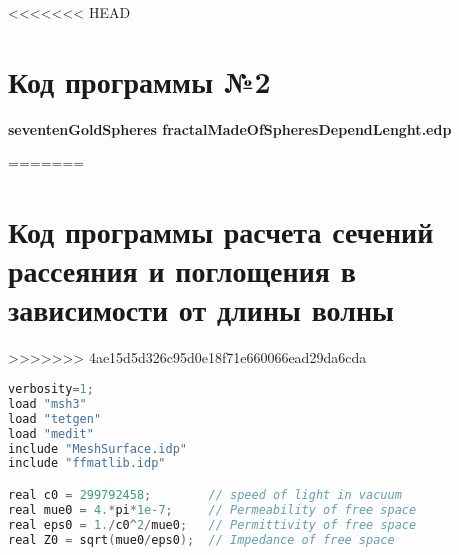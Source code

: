 <<<<<<< HEAD
\chapter{Код программы №2}
\begin{center}
	\textbf{seventenGoldSpheres fractalMadeOfSpheresDependLenght.edp}
\end{center}
=======
\chapter{Код программы расчета сечений рассеяния и поглощения в зависимости от длины волны}

>>>>>>> 4ae15d5d326c95d0e18f71e660066ead29da6cda
\begin{lstlisting}[language=C]
verbosity=1;
load "msh3"
load "tetgen"
load "medit"
include "MeshSurface.idp"
include "ffmatlib.idp"

real c0 = 299792458;        // speed of light in vacuum
real mue0 = 4.*pi*1e-7;     // Permeability of free space
real eps0 = 1./c0^2/mue0;   // Permittivity of free space
real Z0 = sqrt(mue0/eps0);  // Impedance of free space


\end{lstlisting}
